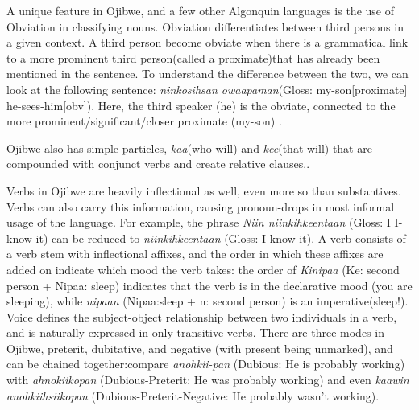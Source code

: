 \documentclass{report}
\begin{document}
A unique feature in Ojibwe, and a few other Algonquin languages is the use of Obviation in classifying nouns. Obviation differentiates between third persons in a given context. A third person become obviate when there is a grammatical link to a more prominent third person(called a proximate)that has already been mentioned in the sentence. To understand the difference between the two, we can look at the following sentence: \emph{ninkosihsan owaapaman}(Gloss: my-son[proximate] he-sees-him[obv]).
Here, the third speaker (he) is the obviate, connected to the more prominent/significant/closer proximate (my-son) \citep{todd1970grammar}.

Ojibwe also has simple particles, \emph{kaa}(who will) and \emph{kee}(that will) that are compounded with conjunct verbs and create relative clauses.\citep{bloomfield2016eastern}. 

Verbs in Ojibwe are heavily inflectional as well, even more so than substantives. Verbs can also carry this information, causing pronoun-drops in most informal usage of the language. For example, the phrase \emph{Niin niinkihkeentaan} (Gloss: I I-know-it) can be reduced to  \emph{niinkihkeentaan} (Gloss: I know it). A verb consists of a verb stem with inflectional affixes, and the order in which these affixes are added on indicate which mood the verb takes: the order of \emph{Kinipaa} (Ke: second person + Nipaa: sleep) indicates that the verb is in the declarative mood (you are sleeping), while \emph{nipaan} (Nipaa:sleep + n: second person) is an imperative(sleep!). Voice defines the subject-object relationship between two individuals in a verb, and is naturally expressed in only transitive verbs. There are three modes in  Ojibwe, preterit, dubitative, and negative (with present being unmarked), and can be chained together:compare \emph{anohkii-pan} (Dubious: He is probably working) with \emph{ahnokiikopan} (Dubious-Preterit: He was probably working) and even \emph{kaawin anohkiihsiikopan} (Dubious-Preterit-Negative: He probably wasn't working)\citep{todd1970grammar}.



 



\end{document}
